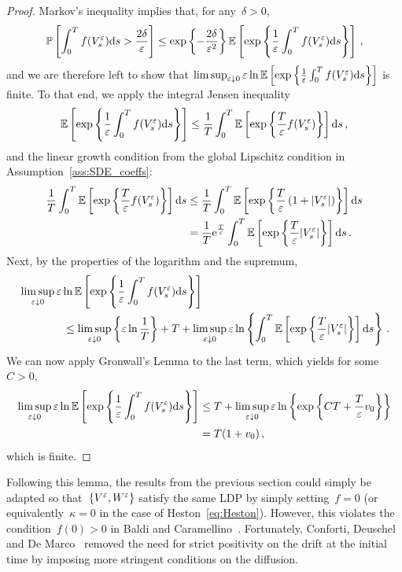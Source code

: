 \begin{proof}
Markov's inequality implies that, for any~$\delta>0$,
\[
\mathbb{P}\left[ \int_0^T f(V_s^\varepsilon)\mathrm{d} s > \frac{2\delta}{\varepsilon} \right] \leq \exp\left\{ -\frac{2\delta}{\varepsilon^2}\right\}\mathbb{E}\left[ \exp\left\{ \frac 1{\varepsilon} \int_0^T f(V_s^\varepsilon)\mathrm{d} s \right\} \right]\,,
\]
and we are therefore left to show that 
$\limsup_{\varepsilon\downarrow 0}\varepsilon\ln\mathbb{E}\left[ \exp\left\{ \frac 1{\varepsilon} \int_0^T f(V_s^\varepsilon)\mathrm{d} s \right\} \right]$
is finite.
To that end, we apply the integral Jensen inequality
\[
\mathbb{E}\left[ \exp\left\{ \frac 1{\varepsilon} \int_0^T f(V_s^\varepsilon)\mathrm{d} s \right\} \right] \leq \frac{1}{T} \int_0^T \mathbb{E}\left[ \exp\left\{ \frac{T}{\varepsilon} f(V_s^\varepsilon) \right\} \right] \mathrm{d} s\,,
\]
and the linear growth condition from the global Lipschitz condition in Assumption~\ref{ass:SDE_coeffs}:
\begin{align*}
\frac{1}{T} \int_0^T \mathbb{E}\left[ \exp\left\{ \frac{T}{\varepsilon} f(V_s^\varepsilon) \right\} \right] \mathrm{d} s &\leq \frac{1}{T} \int_0^T \mathbb{E}\left[ \exp\left\{ \frac{T}{\varepsilon}\left(1 + |V_s^\varepsilon| \right) \right\} \right] \mathrm{d} s \\
&= \frac{1}{T}\mathrm{e}^{\frac{T}{\varepsilon}} \int_0^T \mathbb{E}\left[ \exp\left\{ \frac{T}{\varepsilon} |V_s^\varepsilon| \right\} \right] \mathrm{d} s\,.
\end{align*}
Next, by the properties of the logarithm and the supremum,
\begin{align*}
& \limsup_{\varepsilon\downarrow 0}\varepsilon\ln\mathbb{E}\left[ \exp\left\{ \frac 1{\varepsilon} \int_0^T f(V_s^\varepsilon)\mathrm{d} s \right\} \right] \\ & \qquad \qquad \leq \limsup_{\varepsilon\downarrow 0}\left\{\varepsilon\ln\frac1T\right\} + T + \limsup_{\varepsilon\downarrow 0}\varepsilon\ln\left\{\int_0^T  \mathbb{E}\left[ \exp\left\{ \frac{T}{\varepsilon} |V_s^\varepsilon| \right\} \right] \mathrm{d} s\right\}\,.
\end{align*}
We can now apply Gronwall's Lemma to the last term, which yields for some~$C>0$,
\begin{align*}
    \limsup_{\varepsilon\downarrow 0}\varepsilon\ln\mathbb{E}\left[ \exp\left\{ \frac 1{\varepsilon} \int_0^T f(V_s^\varepsilon)\mathrm{d} s \right\} \right]
    &\leq T + \limsup_{\varepsilon\downarrow 0}\varepsilon\ln\left\{ \exp\left\{ CT + \frac{T}{\varepsilon} v_0 \right\} \right\} \\
    &= T(1+v_0)\,,
\end{align*}
which is finite.
\end{proof}
Following this lemma, the results from the previous section could simply be adapted so that~$\{V^\varepsilon, W^{\varepsilon}\}$ satisfy the same LDP by simply setting~$f=0$ (or equivalently~$\kappa = 0$ in the case of Heston~\eqref{eq:Heston}). However, this violates the condition~$f(0)>0$ in Baldi and Caramellino~\cite{Baldi2011GeneralDiffusions}. Fortunately, Conforti, Deuschel and De Marco~\cite{Conforti2015OnModels} removed the need for strict positivity on the drift at the initial time by imposing more stringent conditions on the diffusion.
